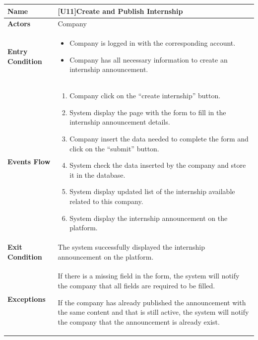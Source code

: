 \begin{center}
    \begin{tabular}{|p{9em}|p{27em}|}
        \hline
        \rowcolor{bluepoli!40} %
        \textbf{Name} & \textbf{[U11]Create and Publish Internship} \\
        \hline
        \textbf{Actors} & Company \\
        \hline
        \textbf{Entry Condition} & 
        \begin{itemize}
            \item Company is logged in with the corresponding account.
            \item Company has all necessary information to create an internship announcement.
        \end{itemize} \\
        \hline
        \textbf{Events Flow} & 
        \begin{enumerate}
            \item Company click on the ``create internship'' button.
            \item System display the page with the form to fill in the internship announcement details.
            \item Company insert the data needed to complete the form and click on the ``submit'' button.
            \item System check the data inserted by the company and store it in the database.
            \item System display updated list of the internship available related to this company.
            \item System display the internship announcement on the platform.
        \end{enumerate} \\
        \hline
        \textbf{Exit Condition} & 
         The system successfully displayed the internship announcement on the platform.\\
        \hline
        \textbf{Exceptions} &
        If there is a missing field in the form, the system will notify the company that all fields are required to be filled.

        If the company has already published the announcement with the same content and that is still active, the system will notify the company
        that the announcement is already exist.\\
        \hline
    \end{tabular}
\end{center}

